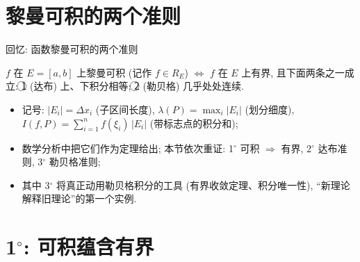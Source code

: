
\section[两准则]{黎曼可积的两个准则}


\begin{frame}{回忆: 函数黎曼可积的两个准则}

\begin{attnblock}[黎曼可积准则]
$f$ 在 $E = [a, b]$ 上黎曼可积 (记作 $f \in R_E$)
$\Longleftrightarrow$ $f$ 在 $E$ 上\alert{有界}, 且下面两条之一成立:
\textcircled{1} (达布) 上、下积分相等; \quad
\textcircled{2} (勒贝格) 几乎处处连续.
\end{attnblock}

\pause

\begin{itemize}
\item 记号: $|E_i| = \Delta x_i$ (子区间长度), $\lambda(P) = \max_i |E_i|$ (划分细度),
  $I(f, P) = \sum_{i=1}^{n} f(\xi_i)\, |E_i|$ (带标志点的积分和);
\item 数学分析中把它们作为定理给出; 本节依次重证:
  \alert{1$^\circ$} 可积 $\Rightarrow$ 有界, \quad
  \alert{2$^\circ$} 达布准则, \quad
  \alert{3$^\circ$} 勒贝格准则;
\item 其中 3$^\circ$ 将真正动用勒贝格积分的工具 (有界收敛定理、积分唯一性),
  ``新理论解释旧理论''的第一个实例.
\end{itemize}

\end{frame}


\section[有界性]{1$^\circ$: 可积蕴含有界}



